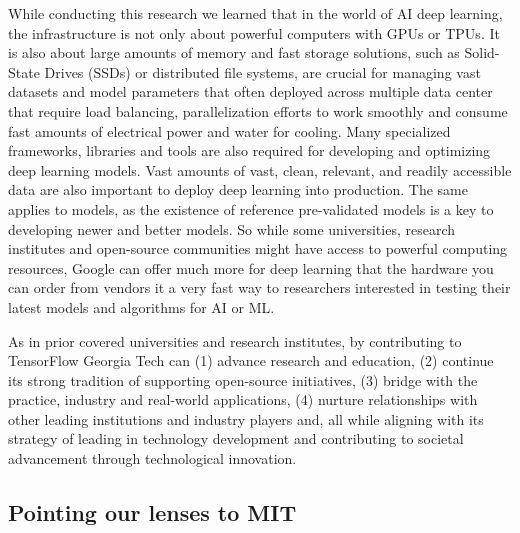 \documentclass[CHICAGO,Times1COL]{WileyNJDv5} %
\begin{document}
While conducting this research we learned that in the world of \ac{AI} deep learning, the infrastructure is not only about powerful computers with \ac{GPUs} or \ac{TPUs}. It is also about large amounts of memory and fast storage solutions, such as Solid-State Drives (SSDs) or distributed file systems, are crucial for managing vast datasets and model parameters that often deployed across multiple data center that require load balancing, parallelization efforts to work smoothly and consume fast amounts of electrical power and water for cooling. Many specialized frameworks, libraries and tools are also required for developing and optimizing deep learning models. Vast amounts of vast, clean, relevant, and readily accessible data are also important to deploy deep learning into production. The same applies to models, as the existence of reference pre-validated models is a key to developing newer and better models. 
So while some universities, research institutes and open-source communities might have access to powerful computing resources, Google can offer much more for deep learning that the hardware you can order from vendors it a very fast way to researchers interested in testing their latest models and algorithms for \ac{AI} or \ac{ML}.

As in prior covered universities and research institutes, by contributing to TensorFlow Georgia Tech can (1) advance research and education, (2) continue its strong tradition of supporting open-source initiatives, (3) bridge with the practice, industry and real-world applications, (4) nurture relationships with other leading institutions and industry players and, all while aligning with its strategy of leading in technology development and contributing to societal advancement through technological innovation.






\subsection{Pointing our lenses to MIT}
\end{document}

